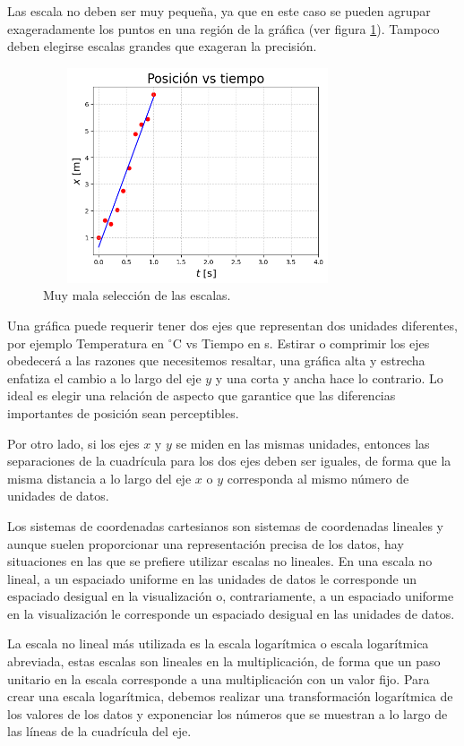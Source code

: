 Las escala no deben ser muy peque\~na, ya que en este  caso se  pueden agrupar exageradamente los puntos en una regi\'on de la gr\'afica (ver figura \ref{escala1}). Tampoco deben elegirse escalas grandes que exageran la precisi\'on.
\begin{figure}[h]
\begin{center}
\includegraphics[height=2.5in,width=3.6in]{figuras/fig09}  
\caption{Muy mala selecci\'on de las escalas.}
\label{escala1}
\end{center}
\end{figure}

Una gr\'afica puede requerir  tener dos ejes que representan dos unidades diferentes, por ejemplo Temperatura en $^\circ$C vs Tiempo en s.  Estirar o comprimir los ejes obedecer\'a a las razones que necesitemos resaltar, una gr\'afica alta y estrecha enfatiza el cambio a lo largo del eje $y$ y una corta y ancha hace lo contrario. Lo ideal es elegir una relaci\'on de aspecto que garantice que las diferencias importantes de posici\'on sean perceptibles.

Por otro lado, si los ejes $x$ y $y$ se miden en las mismas unidades, entonces las separaciones de la cuadr\'icula para los dos ejes deben ser iguales, de forma que la misma distancia a lo largo del eje $x$ o $y$ corresponda al mismo n\'umero de unidades de datos.

Los sistemas de coordenadas cartesianos son sistemas de coordenadas lineales y aunque 
suelen proporcionar una representaci\'on precisa de los datos, hay situaciones en las que se prefiere utilizar escalas no lineales. En una escala no lineal, a un espaciado uniforme en las unidades de datos le corresponde un espaciado desigual en la visualizaci\'on o, contrariamente, a un espaciado uniforme en la visualizaci\'on le corresponde un espaciado desigual en las unidades de datos.

La escala no lineal m\'as utilizada es la escala logar\'itmica o escala logar\'itmica abreviada, estas escalas  son lineales en la multiplicaci\'on, de forma que un paso unitario en la escala corresponde a una multiplicaci\'on con un valor fijo. Para crear una escala logar\'itmica, debemos realizar una transformaci\'on logar\'itmica de los valores de los datos y exponenciar los n\'umeros que se muestran a lo largo de las l\'ineas de la cuadr\'icula del eje.


